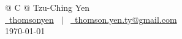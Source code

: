 


\pagestyle{empty}

\begin{tabularx}{\linewidth}{@{} C @{}}
\Huge{Tzu-Ching Yen} \\[7.5pt]
\href{https://linkedin.com/in/thomsonyen}{\raisebox{-0.05\height}\faLinkedin\ thomsonyen} \ $|$ \
\href{mailto:thomson.yen.ty@gmail.com}{\raisebox{-0.05\height}\faEnvelope \ thomson.yen.ty@gmail.com} \\[5pt]
\today \\
\end{tabularx}




